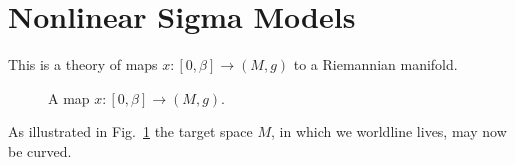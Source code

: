 
\section{Nonlinear Sigma Models}%
\label{sec:nonlinear_sigma_models}

This is a theory of maps $x \colon [0, \beta] \to (M, g)$  to a Riemannian manifold.
\begin{figure}[tbhp]
  \centering
  \def\svgwidth{0.5\columnwidth}
  
  \caption{A map $x\colon [0, \beta] \to (M, g)$.}
  \label{fig:l9f1}
\end{figure}
As illustrated in Fig.~\ref{fig:l9f1} the target space $M$, in which we worldline lives, may now be curved.

